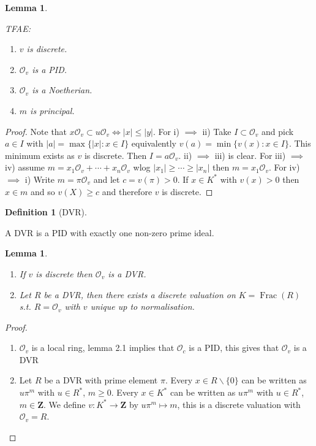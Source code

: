 \documentclass[10pt,]{book}
\newcommand{\gt}{>}
\theoremstyle{plain}
\newtheorem{lemma}[theorem]{Lemma}
\theoremstyle{definition}
\newtheorem{definition}[theorem]{Definition}
\newcommand{\ZZ}{\mathbf{Z}}
\newcommand{\cO}{\mathcal{O}}
\DeclareMathOperator{\Frac}{Frac}
\begin{document}
\begin{lemma}\label{lemma-6}

            TFAE:
            \begin{enumerate}
\item{}\(v\) is discrete.\item{}\(\cO_v\) is a PID.\item{}\(\cO_v\) is a Noetherian.\item{}\(m\) is principal.\end{enumerate}
\end{lemma}
\begin{proof}

            Note that \(x\cO_v \subset u \cO_v \iff |x| \le |y|\).
            For i) \(\implies\) ii) Take \(I \subset \cO_v\) and pick \(a\in I\) with \(|a| = \max\{|x| : x\in I\}\) equivalently \(v(a) = \min\{v(x) : x\in I\}\).
            This minimum exists as \(v\) is discrete.
            Then \(I = a\cO_v\).
            ii) \(\implies\) iii) is clear.
            For iii) \(\implies\) iv) assume \(m = x_1 \cO_v + \cdots + x_n \cO_v\) wlog \(|x_1|\ge \cdots \ge |x_n|\) then \(m = x_1 \cO_v\).
            For iv) \(\implies\) i) Write \(m = \pi \cO_v\) and let \(c = v(\pi) \gt 0\). If \(x\in K^*\) with \(v(x) \gt 0\) then \(x\in m\) and so \(v(X) \ge c\) and therefore \(v\) is discrete.
          \end{proof}
\begin{definition}[DVR]\label{definition-7}

            A DVR is a PID with exactly one non-zero prime ideal.
          \end{definition}
\begin{lemma}\label{lemma-7}
\begin{enumerate}
\item{}
                If \(v\) is discrete then \(\cO_v\) is a DVR.
              \item{}Let \(R\) be a DVR, then there exists a discrete valuation on \(K = \Frac(R)\) s.t. \(R = \cO_v\) with \(v\) unique up to normalisation.\end{enumerate}
\end{lemma}
\begin{proof}
\begin{enumerate}
\item{}\(\cO_v\) is a local ring, lemma 2.1  implies that \(\cO_c\) is a PID, this gives that \(\cO_v\) is a DVR\item{}Let \(R\) be a DVR with prime element \(\pi\).
              Every \(x\in R\smallsetminus \{0\}\) can be written as \(u\pi^m\) with \(u\in R^*\), \(m\ge 0\).
              Every \(x\in K^*\) can be written as \(u\pi^m\) with \(u\in R^*\), \(m\in \ZZ\).
              We define \(v \colon K^* \to \ZZ\) by \(u\pi^m \mapsto m\), this is a discrete valuation with \(\cO_v = R\).\end{enumerate}
\end{proof}
\end{document}
